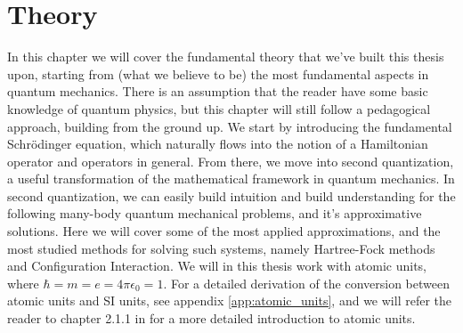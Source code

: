 \documentclass{subfiles}
\begin{document}
\chapter{Theory}
In this chapter we will cover the fundamental theory that we've built this thesis upon, starting from (what we believe to be) the most fundamental aspects in quantum mechanics.
There is an assumption that the reader have some basic knowledge of quantum physics, but this chapter will still follow a pedagogical approach, building from the ground up.
We start by introducing the fundamental Schrödinger equation, which naturally flows into the notion of a Hamiltonian operator and operators in general. From there, we move into 
second quantization, a useful transformation of the mathematical framework in quantum mechanics. In second quantization, we can easily build intuition and build understanding for
the following many-body quantum mechanical problems, and it's approximative solutions. Here we will cover some of the most applied approximations, and the most studied methods for solving
such systems, namely Hartree-Fock methods and Configuration Interaction. We will in this thesis work with atomic units, where $\hbar = m = e = 4\pi\epsilon_0 = 1$. For a detailed derivation of the conversion between atomic units and SI units, see appendix \ref{app:atomic_units}, and we will refer the reader to chapter 2.1.1 in \cite{szabo2012modern} for a more detailed introduction to atomic units.
\newpage





\end{document}
